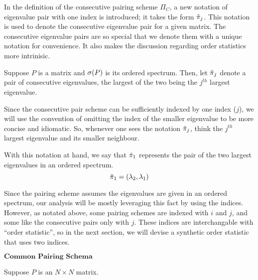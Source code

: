 \newpage


In the definition of the consecutive pairing scheme $\Pi_C$, a new notation of eigenvalue pair with one index is introduced; it takes the form ${\tilde{\pi}}_j$. This notation is used to denote the consecutive eigenvalue pair for a given matrix. The consecutive eigenvalue pairs are so special that we denote them with a unique notation for convenience. It also makes the discussion regarding order statistics more intrinisic.

\begin{definition}
Suppose $P$ is a matrix and $\sigma(P)$ is its ordered spectrum. Then, let ${\tilde{\pi}}_j$ denote a pair of consecutive eigenvalues, the largest of the two being the $j^{th}$ largest eigenvalue.
\end{definition}

Since the consecutive pair scheme can be sufficiently indexed by one index ($j$), we will use the convention of omitting the index of the smaller eigenvalue to be more concise and idiomatic. So, whenever one sees the notation ${\tilde{\pi}}_j$, think the $j^{th}$ largest eigenvalue and its smaller neighbour.

\begin{example}
With this notation at hand, we say that ${\tilde{\pi}}_1$ represents the pair of the two largest eigenvalues in an ordered spectrum.
$${\tilde{\pi}}_1 = (\lambda_2,\lambda_1)$$
\end{example}

\begin{remark}
Since the pairing scheme assumes the eigenvalues are given in an ordered spectrum, our analysis will be mostly leveraging this fact by using the indices. However, as notated above, some pairing schemes are indexed with $i$ and $j$, and some like the consecutive pairs only with $j$. These indices are interchangable with ``order statistic'', so in the next section, we will devise a synthetic order statistic that uses two indices.
\end{remark}


\begin{center}
$\textbf{Common Pairing Schema}$
\end{center}

Suppose $P$ is an $N \times N$ matrix. \newline


